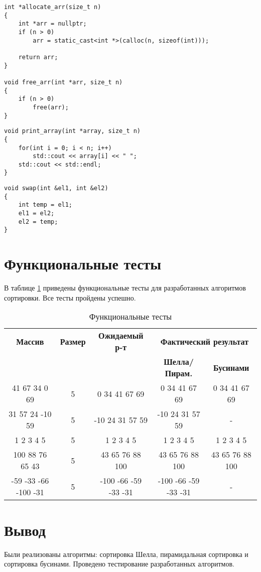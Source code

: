 \clearpage

\begin{lstlisting}[label=lst:allocate,caption=Функции выделение и освобождение памяти под массив]
int *allocate_arr(size_t n)
{
	int *arr = nullptr;
	if (n > 0)
		arr = static_cast<int *>(calloc(n, sizeof(int)));
	
	return arr;
}

void free_arr(int *arr, size_t n)
{
	if (n > 0)
		free(arr);
}
\end{lstlisting}

\begin{lstlisting}[label=lst:print,caption=Функция вывода print\_arr]
void print_array(int *array, size_t n)
{
	for(int i = 0; i < n; i++)
		std::cout << array[i] << " ";
	std::cout << std::endl;
}
\end{lstlisting}

\begin{lstlisting}[label=lst:swap,caption=Функция перестановки элементов места swap]
void swap(int &el1, int &el2)
{
	int temp = el1;
	el1 = el2;
	el2 = temp;
}
\end{lstlisting}

\clearpage

\section{Функциональные тесты}

В таблице \ref{tbl:func_tests} приведены функциональные тесты для разработанных алгоритмов сортировки. Все тесты пройдены успешно.

\begin{table}[ht]
	\small
	\begin{center}
		\caption{Функциональные тесты}
		\label{tbl:func_tests}
		\begin{tabular}{|c|c|c|c|c|}
			\hline
			\bfseries Массив
			& \bfseries Размер
			& \bfseries Ожидаемый р-т
			& \multicolumn{2}{c|}{\bfseries Фактический результат} \\ \cline{4-5}
			& & & \bfseries Шелла/Пирам. & \bfseries Бусинами \\
			\hline
			41 67 34 0 69 & 5 & 0 34 41 67 69 & 0 34 41 67 69 & 0 34 41 67 69 \\
			\hline
			31 57 24 -10 59 & 5 & -10 24 31 57 59 & -10 24 31 57 59 & - \\
			\hline
			1 2 3 4 5 & 5 & 1 2 3 4 5 & 1 2 3 4 5 & 1 2 3 4 5 \\
			\hline
			100 88 76 65 43 & 5 & 43 65 76 88 100 & 43 65 76 88 100 & 43 65 76 88 100 \\
			\hline
			-59 -33 -66 -100 -31 & 5 & -100 -66 -59 -33 -31 & -100 -66 -59 -33 -31 & - \\
			\hline
		\end{tabular}
	\end{center}
\end{table}

\section{Вывод}

Были реализованы алгоритмы: сортировка Шелла, пирамидальная сортировка и сортировка бусинами. Проведено тестирование разработанных алгоритмов.
